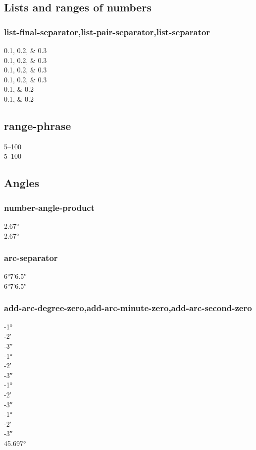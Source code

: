 \documentclass{article}
\begin{document}
\subsection{Lists and ranges of numbers}
\subsubsection{list-final-separator,list-pair-separator,list-separator}
\numlist{0.1;0.2;0.3}\\
\numlist[list-separator = {; }]{0.1;0.2;0.3}\\
\numlist[list-final-separator = {, }]{0.1;0.2;0.3} \\
\numlist[
list-separator
= { and },
list-final-separator = { and finally }
]{0.1;0.2;0.3} \\
\numlist{0.1;0.2} \\
\numlist[list-pair-separator = {, and }]{0.1;0.2}\\

\subsection{range-phrase}

\numrange{5}{100} \\
\numrange[range-phrase = --]{5}{100}\\

\subsection{Angles}
\subsubsection{number-angle-product}
\ang{2.67} \\
\ang[number-angle-product = \,]{2.67}
\subsubsection{arc-separator}
\ang{6;7;6.5} \\
\ang[arc-separator = \,]{6;7;6.5}
\subsubsection{add-arc-degree-zero,add-arc-minute-zero,add-arc-second-zero}
\ang{-1;;} \\
\ang{;-2;} \\
\ang{;;-3} \\
{
\ang{-1;;} \\
\ang{;-2;} \\
\ang{;;-3} \\
}
{
\ang{-1;;} \\
\ang{;-2;} \\
\ang{;;-3} \\
}
{
\ang{-1;;} \\
\ang{;-2;} \\
\ang{;;-3}\\
}
\ang[add-arc-minute-zero,add-arc-second-zero]{45.697}\\
\end{document}
